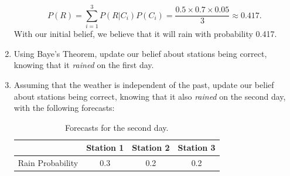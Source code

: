 \documentclass[11pt]{article}
\numberwithin{equation}{section}
\newcommand{\sol}[1]{
    }
\begin{document}
\begin{enumerate}
{        \begin{equation*}
            P(R) = \sum_{i=1}^3 P(R|C_i) P(C_i) = \dfrac{0.5 \times 0.7 \times 0.05}{3} \approx 0.417.
        \end{equation*}
        With our initial belief, we believe that it will rain with probability 0.417.
    }
    \item Using Baye's Theorem, update our belief about stations being correct, knowing that it \emph{rained} on the first day.


    \sol{

        Let's update our belief for all three stations. For each station $i$, we have:
        \begin{equation*}
            P(C_i | R) = \dfrac{P(R | C_i) P(C_i)}{P(R)}.
        \end{equation*}

        We end up with:
        \begin{itemize}
            \item $P(C_i | R) = 0.4$,
            \item $P(C_i | R) = 0.56$,
            \item $P(C_i | R) = 0.04$.
        \end{itemize}

        What happens is that we believe a lot more more in the second station now, but almost no longer believe in the third one.

    }

    \item Assuming that the weather is independent of the past, update our belief about stations being correct, knowing that it also \emph{rained} on the second day, with the following forecasts:
    \begin{table}[h]
        \centering
        \begin{tabular}{ c | c c c }
            & Station 1 & Station 2 & Station 3 \\ 
           \hline
           Rain Probability & 0.3 & 0.2 & 0.2 \\
          \end{tabular}
        \caption{Forecasts for the second day.}
    \end{table}

    \sol{

    \paragraph{Additional notations}
    \begin{itemize}
        \item $C^2_i$: station $i$'s forecast is correct for the second day.
        \item $R^2$: it will rain on the second day.
    \end{itemize}

}
\end{enumerate}
\end{document}
